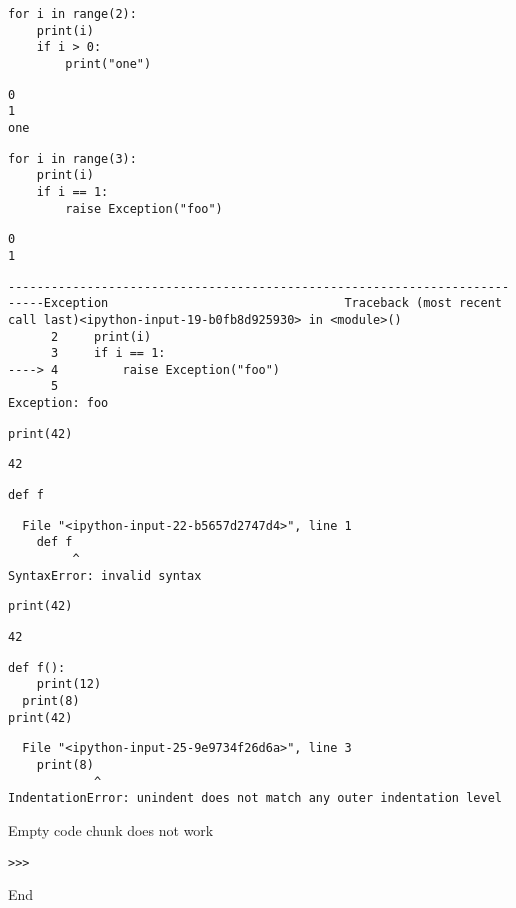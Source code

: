 \begin{verbatim}
for i in range(2):
    print(i)
    if i > 0:
        print("one")
\end{verbatim}
\begin{verbatim}
0
1
one
\end{verbatim}


\begin{verbatim}
for i in range(3):
    print(i)
    if i == 1:
        raise Exception("foo")
\end{verbatim}
\begin{verbatim}
0
1
\end{verbatim}
\begin{verbatim}
---------------------------------------------------------------------------Exception                                 Traceback (most recent call last)<ipython-input-19-b0fb8d925930> in <module>()
      2     print(i)
      3     if i == 1:
----> 4         raise Exception("foo")
      5 
Exception: foo
\end{verbatim}

\begin{verbatim}
print(42)
\end{verbatim}
\begin{verbatim}
42
\end{verbatim}


\begin{verbatim}
def f
\end{verbatim}
\begin{verbatim}
  File "<ipython-input-22-b5657d2747d4>", line 1
    def f
         ^
SyntaxError: invalid syntax
\end{verbatim}

\begin{verbatim}
print(42)
\end{verbatim}
\begin{verbatim}
42
\end{verbatim}


\begin{verbatim}
def f():
    print(12)
  print(8)
print(42)
\end{verbatim}
\begin{verbatim}
  File "<ipython-input-25-9e9734f26d6a>", line 3
    print(8)
            ^
IndentationError: unindent does not match any outer indentation level
\end{verbatim}

Empty code chunk does not work

\begin{verbatim}
>>>

\end{verbatim}

End

